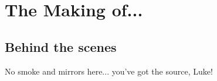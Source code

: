 
\chapter{The Making of...}
		\label{appendix}


\section{Behind the scenes}

No smoke and mirrors here... you've got the source, Luke!
